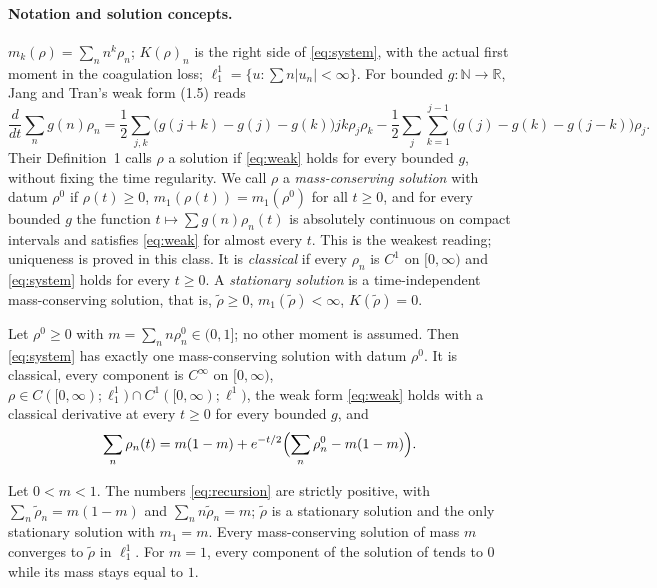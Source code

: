 \documentclass[11pt,a4paper]{report}
\newcommand{\NN}{\mathbb N}
\newcommand{\rtil}{\tilde\rho}
\begin{document}
\paragraph{Notation and solution concepts.}
\(m_k(\rho)=\sum_n n^k\rho_n\); \(K(\rho)_n\) is the right side of \eqref{eq:system}, with the actual first
moment in the coagulation loss; \(\ell^1_1=\{u:\sum n|u_n|<\infty\}\). For bounded \(g:\NN\to\mathbb R\),
Jang and Tran's weak form (1.5) reads
\begin{equation}\label{eq:weak}
\frac{d}{dt}\sum_n g(n)\rho_n=\frac12\sum_{j,k}\bigl(g(j{+}k)-g(j)-g(k)\bigr)jk\rho_j\rho_k
-\frac12\sum_j\sum_{k=1}^{j-1}\bigl(g(j)-g(k)-g(j{-}k)\bigr)\rho_j .
\end{equation}
Their Definition~1 calls \(\rho\) a solution if \eqref{eq:weak} holds for every bounded \(g\), without fixing
the time regularity. We call \(\rho\) a \emph{mass-conserving solution} with datum \(\rho^0\) if
\(\rho(t)\ge0\), \(m_1(\rho(t))=m_1(\rho^0)\) for all \(t\ge0\), and for every bounded \(g\) the function
\(t\mapsto\sum g(n)\rho_n(t)\) is absolutely continuous on compact intervals and satisfies \eqref{eq:weak}
for almost every \(t\). This is the weakest reading; uniqueness is proved in this class. It is
\emph{classical} if every \(\rho_n\) is \(C^1\) on \([0,\infty)\) and \eqref{eq:system} holds for every
\(t\ge0\). A \emph{stationary solution} is a time-independent mass-conserving solution, that is,
\(\tilde\rho\ge0\), \(m_1(\tilde\rho)<\infty\), \(K(\tilde\rho)=0\).

\begin{theorem}\label{thm:evolution}
Let \(\rho^0\ge0\) with \(m=\sum_n n\rho^0_n\in(0,1]\); no other moment is assumed. Then \eqref{eq:system}
has exactly one mass-conserving solution with datum \(\rho^0\). It is classical, every component is
\(C^\infty\) on \([0,\infty)\),
\(\rho\in C([0,\infty);\ell^1_1)\cap C^1([0,\infty);\ell^1)\), the weak form \eqref{eq:weak} holds with a
classical derivative at every \(t\ge0\) for every bounded \(g\), and
\[
\sum_n\rho_n(t)=m(1-m)+e^{-t/2}\Bigl(\sum_n\rho^0_n-m(1-m)\Bigr).
\]
\end{theorem}

\begin{theorem}\label{thm:stationary}
Let \(0<m<1\). The numbers \eqref{eq:recursion} are strictly positive, with
\(\sum_n\rtil_n=m(1-m)\) and \(\sum_n n\rtil_n=m\); \(\rtil\) is a stationary solution and the only stationary
solution with \(m_1=m\). Every mass-conserving solution of mass \(m\) converges to \(\rtil\) in \(\ell^1_1\).
For \(m=1\), every component of the solution of  tends to \(0\) while its mass stays
equal to \(1\).
\end{theorem}
\end{document}
